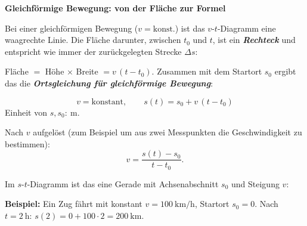 \documentclass[addpoints,11pt,a4paper]{exam}
\newenvironment{theoriebox}[1][Theorie]{%
  \par\addvspace{10pt}\noindent\textbf{#1}\par\smallskip\noindent
}{%
  \par\addvspace{10pt}
}
\begin{document}
\begin{theoriebox}[Gleichförmige Bewegung: von der Fläche zur Formel]
Bei einer gleichförmigen Bewegung ($v=\text{konst.}$) ist das
$v$-$t$-Diagramm eine waagrechte Linie. Die Fläche darunter, zwischen
$t_0$ und $t$, ist ein \textbf{\emph{Rechteck}} und entspricht wie immer
der zurückgelegten Strecke $\Delta s$:

\begin{center}
\end{center}

Fläche $=$ Höhe $\times$ Breite $=v\,(t-t_0)$. Zusammen mit dem Startort
$s_0$ ergibt das die \textbf{\emph{Ortsgleichung für gleichförmige
Bewegung}}:

\begin{formelbox}
\[
  v = \text{konstant}, \qquad s(t) = s_0 + v\,(t-t_0)
\]
Einheit von $s,s_0\colon\ \si{\meter}$.
\end{formelbox}

Nach $v$ aufgelöst (zum Beispiel um aus zwei Messpunkten die
Geschwindigkeit zu bestimmen):
\[
  v = \frac{s(t)-s_0}{t-t_0}.
\]

Im $s$-$t$-Diagramm ist das eine Gerade mit Achsenabschnitt $s_0$ und
Steigung $v$:

\begin{center}
\end{center}

\textbf{Beispiel:} Ein Zug fährt mit konstant
$v=\SI{100}{\kilo\meter\per\hour}$, Startort $s_0=0$. Nach
$t=\SI{2}{\hour}$: $s(2) = 0 + 100\cdot2 = \SI{200}{\kilo\meter}$.
\end{theoriebox}
\end{document}
